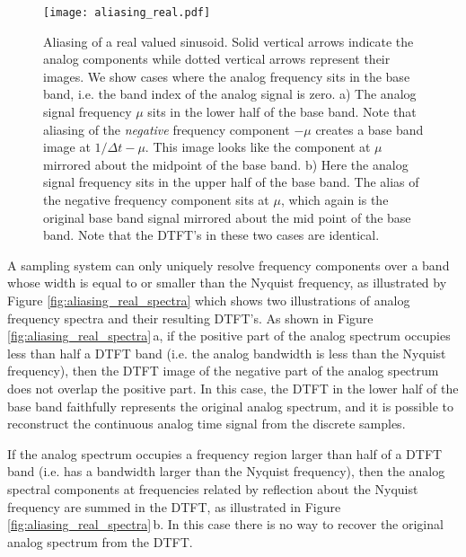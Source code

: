 \begin{figure*}[h]
  \begin{centering}
    \texttt{[image: aliasing\_real.pdf]}
  \par\end{centering}
  \caption{Aliasing of a real valued sinusoid.
Solid vertical arrows indicate the analog components while dotted vertical arrows represent their images.
We show cases where the analog frequency sits in the base band, i.e. the band index of the analog signal is zero.
a) The analog signal frequency $\mu$ sits in the lower half of the base band.
Note that aliasing of the \emph{negative} frequency component $-\mu$ creates a base band image at $1/\Delta t - \mu$.
This image looks like the component at $\mu$ mirrored about the midpoint of the base band.
b) Here the analog signal frequency sits in the upper half of the base band.
The alias of the negative frequency component sits at $\mu$, which again is the original base band signal mirrored about the mid point of the base band.
Note that the DTFT's in these two cases are identical.}
  \label{fig:aliasing_real}
\end{figure*}

A sampling system can only uniquely resolve frequency components over a band whose width is equal to or smaller than the Nyquist frequency, as illustrated by Figure \ref{fig:aliasing_real_spectra} which shows two illustrations of analog frequency spectra and their resulting DTFT's.
As shown in Figure \ref{fig:aliasing_real_spectra}\,a, if the positive part of the analog spectrum occupies less than half a DTFT band (i.e. the analog bandwidth is less than the Nyquist frequency), then the DTFT image of the negative part of the analog spectrum does not overlap the positive part.
In this case, the DTFT in the lower half of the base band faithfully represents the original analog spectrum, and it is possible to reconstruct the continuous analog time signal from the discrete samples.

If the analog spectrum occupies a frequency region larger than half of a DTFT band (i.e. has a bandwidth larger than the Nyquist frequency), then the analog spectral components at frequencies related by reflection about the Nyquist frequency are summed in the DTFT, as illustrated in Figure \ref{fig:aliasing_real_spectra}\,b.
In this case there is no way to recover the original analog spectrum from the DTFT.

